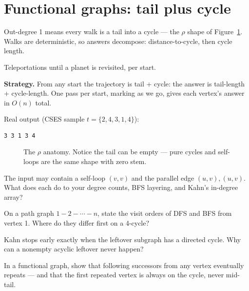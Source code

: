 \section{Functional graphs: tail plus cycle}\label{sec:func}
Out-degree 1 means every walk is a tail into a cycle --- the $\rho$
shape of Figure~\ref{fig:rho}. Walks are deterministic, so answers
decompose: distance-to-cycle, then cycle length.
\begin{example}\label{ex:planets}
Teleportations until a planet is revisited, per start.
\par\smallskip
\textbf{Strategy.} From any start the trajectory is tail + cycle: the
answer is tail-length + cycle-length. One pass per start, marking as
we go, gives each vertex's answer in $O(n)$ total.
\par\smallskip
\begin{solution}

Real output (CSES sample $t=\{2,4,3,1,4\}$):
\begin{lstlisting}[numbers=none]
3 3 1 3 4
\end{lstlisting}
\end{solution}
\end{example}
\begin{figure}[ht]\centering

\caption{The $\rho$ anatomy. Notice the tail can be empty --- pure
cycles and self-loops are the same shape with zero stem.}
\label{fig:rho}
\end{figure}

\begin{exercise}[easy]\label{exr:edgecase}
The input may contain a self-loop $(v,v)$ and the parallel edge
$(u,v),(u,v)$. What does each do to your degree counts, BFS layering,
and Kahn's in-degree array?
\end{exercise}
\begin{exercise}[medium]\label{exr:bfsdfs}
On a path graph $1{-}2{-}\cdots{-}n$, state the visit orders of DFS
and BFS from vertex 1. Where do they differ first on a 4-cycle?
\end{exercise}
\begin{exercise}[medium]\label{exr:kahnstop}
Kahn stops early exactly when the leftover subgraph has a directed
cycle. Why can a nonempty acyclic leftover never happen?
\end{exercise}
\begin{exercise}[medium]\label{exr:funcentry}
In a functional graph, show that following successors from any vertex
eventually repeats --- and that the first repeated vertex is always
on the cycle, never mid-tail.
\end{exercise}

